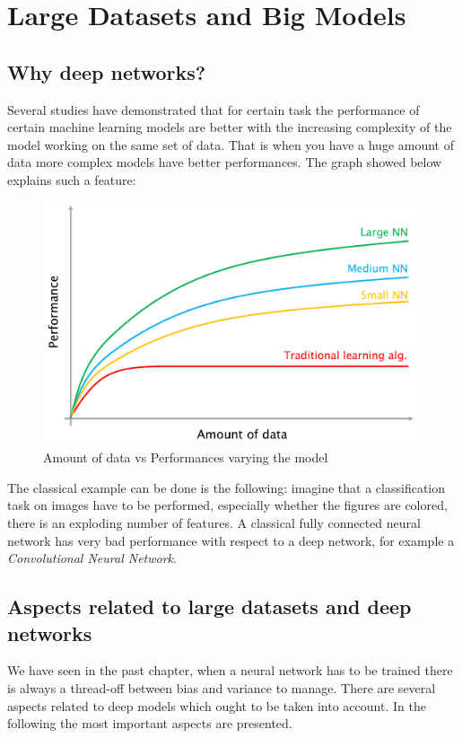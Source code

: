 \chapter[Large Datasets and CNN]{Large Datasets and Big Models}

\section{Why deep networks?}
Several studies have demonstrated that for certain task the performance of certain machine learning models are better with the increasing complexity of the model working on the same set of data. That is when you have a huge amount of data more complex models have better performances. 
The graph showed below explains such a feature:
\begin{figure}[h]
    \centering
    \includegraphics[scale=0.4]{img/perf.png}
    \caption{Amount of data vs Performances varying the model}
\end{figure}
The classical example can be done is the following: imagine that a classification task on images have to be performed, especially whether the figures are colored, there is an exploding number of features. A classical fully connected neural network has very bad performance with respect to a deep network, for example a \textit{Convolutional Neural Network}.

\section{Aspects related to large datasets and deep networks}
We have seen in the past chapter, when a neural network has to be trained there is always a thread-off between bias and variance to manage. There are several aspects related to deep models which ought to be taken into account. In the following the most important aspects are presented.

